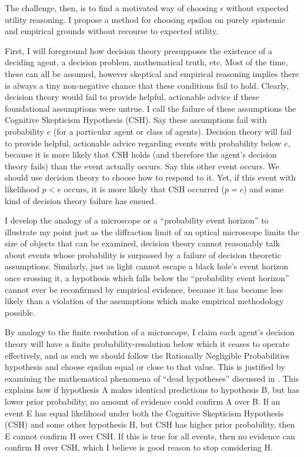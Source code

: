 \documentclass{article}
\begin{document}
The challenge, then, is to find a motivated way of choosing \(\epsilon\) without expected utility reasoning. I propose a method for choosing epsilon on purely epistemic and empirical grounds without recourse to expected utility. 

First, I will foreground how decision theory presupposes the existence of a deciding agent, a decision problem, mathematical truth, etc. Most of the time, these can all be assumed, however skeptical and empirical reasoning implies there is always a tiny non-negative chance that these conditions fail to hold. Clearly, decision theory would fail to provide helpful, actionable advice if these foundational assumptions were untrue. I call the failure of these assumptions the Cognitive Skepticism Hypothesis (CSH). Say these assumptions fail with probability \(e\) (for a particular agent or class of agents). Decision theory will fail to provide helpful, actionable advice regarding events with probability below \(e\), because it is more likely that CSH holds (and therefore the agent's decision theory fails) than the event actually occurs. Say this other event occurs. We should use decision theory to choose how to respond to it. Yet, if this event with likelihood \(p<e\) occurs, it is more likely that CSH occurred (\(p=e\)) and some kind of decision theory failure has ensued.

I develop the analogy of a microscope or a ``probability event horizon'' to illustrate my point \textemdash{} just as the diffraction limit of an optical microscope limits the size of objects that can be examined, decision theory cannot reasonably talk about events whose probability is surpassed by a failure of decision theoretic assumptions. Similarly, just as light cannot escape a black hole's event horizon once crossing it, a hypothesis which falls below the ``probability event horizon'' cannot ever be reconfirmed by empirical evidence, because it has become less likely than a violation of the assumptions which make empirical methodology possible. 

By analogy to the finite resolution of a microscope, I claim each agent's decision theory will have a finite probability-resolution below which it ceases to operate effectively, and as such we should follow the Rationally Negligible Probabilities hypothesis and choose epsilon equal or close to that value. This is justified by examining the mathematical phenomena of ``dead hypotheses'' discussed in \citet{jaynes2003probability}. This explains how if hypothesis A makes identical predictions to hypothesis B, but has lower prior probability, no amount of evidence could confirm A over B. If an event E has equal likelihood under both the Cognitive Skepticism Hypothesis (CSH) and some other hypothesis H, but CSH has higher prior probability, then E cannot confirm H over CSH. If this is true for all events, then no evidence can confirm H over CSH, which I believe is good reason to stop considering H.
\end{document}
